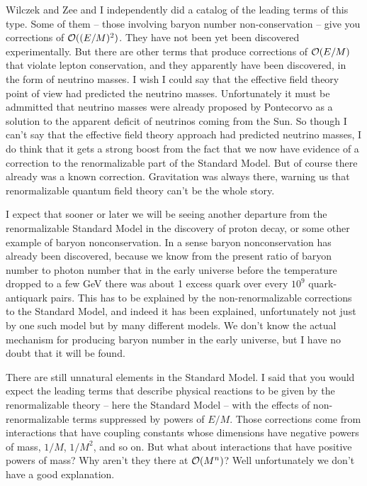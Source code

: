Wilczek and Zee and I independently did a catalog of the leading terms of this type. Some of them -- those involving baryon number non-conservation -- give you corrections of ${\cal O}((E/M)^2)$. They have not been yet been discovered experimentally. But there are other terms that produce corrections of ${\cal O}(E/M)$ that violate lepton conservation, and they apparently have been discovered, in the form of neutrino masses. I wish I could say that the effective field theory point of view had predicted the neutrino masses. Unfortunately it must be admmitted that neutrino masses were already proposed by Pontecorvo as a solution to the apparent deficit of neutrinos coming from the Sun. So though I can't say that the effective field theory approach had predicted neutrino masses,  I do think  that it gets a strong boost from the fact that we now  have evidence of a correction to the renormalizable part of the Standard Model. But  of course there already was a known correction.  
Gravitation was always there, warning us that renormalizable quantum field theory can't be the whole story. 

I expect that sooner or later we will be seeing another departure from the renormalizable Standard Model in the discovery of proton decay, or some other example of  baryon nonconservation. In a sense baryon nonconservation has already been discovered, because we know from the present ratio of baryon number to photon number that in the early universe before the temperature dropped to a few GeV there was about 1 excess quark over every $10^9$ quark-antiquark pairs.  This has to be explained by the non-renormalizable corrections to the Standard Model, and indeed it has been explained, unfortunately not just by one such model but by many different models.  We don't know the actual mechanism for producing baryon number in the early universe, but I have no doubt that it will be found.

 There are still unnatural elements in the Standard Model. I said that you would expect the leading terms that describe physical reactions to be given by the renormalizable theory -- here the Standard Model -- with the effects  of  non-renormalizable terms suppressed by powers of $E/M$. Those corrections come from interactions that have coupling constants whose dimensions have negative powers of mass, $1/M$, $1/M^2$, and so on. But what about interactions that have positive powers of mass? Why aren't they there at ${\cal O}(M^n)$? Well unfortunately we don't have a good explanation. 

